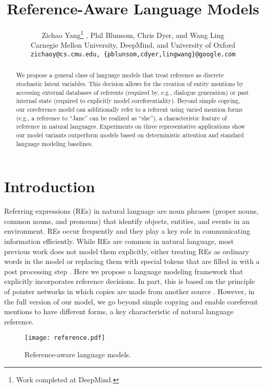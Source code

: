 \documentclass[11pt,letterpaper]{article}
\title{Reference-Aware Language Models}
\author{Zichao Yang\thanks{Work completed at DeepMind.} , Phil Blunsom, Chris Dyer, and Wang Ling \\
  Carnegie Mellon University, DeepMind, and University of Oxford\\
  {\tt zichaoy@cs.cmu.edu, \{pblunsom,cdyer,lingwang\}@google.com} }
\date{}
\begin{document}
\maketitle

\begin{abstract}
  We propose a general class of language models that treat reference as discrete
  stochastic latent variables. This decision allows for the creation of entity 
  mentions by accessing external databases of referents (required by, e.g., dialogue generation) or
  past internal state (required to explicitly model coreferentiality). Beyond 
  simple copying, our coreference model can additionally refer to a referent using varied 
  mention forms (e.g., a reference to ``Jane'' can be realized as ``she''), a characteristic 
  feature of reference in natural languages. Experiments on three
  representative applications show our model variants outperform models based
  on deterministic attention and standard language modeling baselines.
\end{abstract}

\section{Introduction}
Referring expressions (REs) in natural language are noun phrases (proper nouns,
common nouns, and pronouns) that identify objects, entities, and events in an
environment. REs occur frequently and they play a key role in communicating
information efficiently. While REs are common in natural language, most
previous work does not model them explicitly, either treating REs as ordinary
words in the model or replacing them with special tokens that are filled in with
a post processing step \cite{wen:2016,LuongSLVZ15}. Here we propose a language modeling
framework that explicitly incorporates reference decisions. In part, this is based on 
the principle of pointer networks in which copies are made from another source \citep{GulcehreANZB16,GuLLL16,ling:2016,ptrnets,ahn:2016, merity2016pointer}. 
However, in the full version of our model, we go beyond simple copying and enable 
coreferent mentions to have different forms, a key characteristic of natural language reference.

\begin{figure}[!tb]
  \centering
  \texttt{[image: reference.pdf]}
  \caption{Reference-aware language models.}
  \label{fig:reference}
\end{figure}
\end{document}
